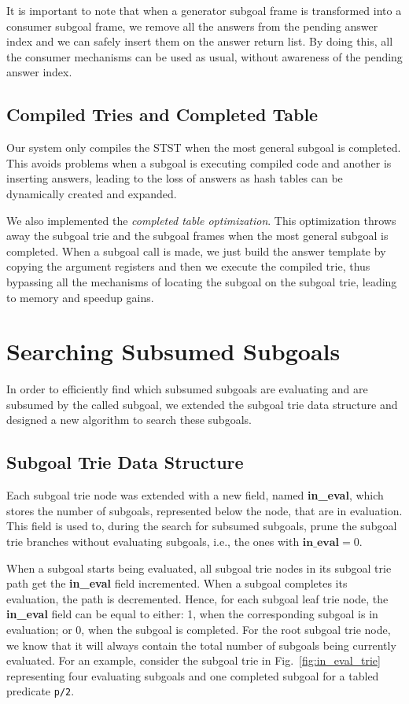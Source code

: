 It is important to note that when a generator subgoal frame is transformed into a
consumer subgoal frame, we remove all the answers from the pending answer index
and we can safely insert them on the answer return list. By doing this, all the consumer mechanisms
can be used as usual, without awareness of the pending answer index.

\subsection{Compiled Tries and Completed Table}

Our system only compiles the STST when the most general subgoal is completed.
This avoids problems when a subgoal is executing compiled code and another
is inserting answers, leading to the loss of answers as hash tables can be
dynamically created and expanded.

We also implemented the \textit{completed table optimization}. This optimization throws
away the subgoal trie and the subgoal frames when the most general subgoal is completed.
When a subgoal call is made, we just build the answer template by copying the argument
registers and then we execute the compiled trie, thus bypassing all the mechanisms of
locating the subgoal on the subgoal trie, leading to memory and speedup gains. 

\section{Searching Subsumed Subgoals}\label{sec:searching_subsumed}

In order to efficiently find which subsumed subgoals are evaluating and are subsumed
by the called subgoal, we extended the subgoal trie data structure and designed a new
algorithm to search these subgoals.

\subsection{Subgoal Trie Data Structure}

Each subgoal trie node was extended with a new field, named
\textbf{in\_eval}, which stores the number of subgoals, represented below the
node, that are in evaluation. This field is used to, during the search
for subsumed subgoals, prune the subgoal trie branches without
evaluating subgoals, i.e., the ones with $\textbf{in\_eval} = 0$.

When a subgoal starts being evaluated, all subgoal trie nodes in its
subgoal trie path get the \textbf{in\_eval} field incremented. When a subgoal
completes its evaluation, the path is decremented. Hence, for each
subgoal leaf trie node, the \textbf{in\_eval} field can be equal to either:
1, when the corresponding subgoal is in evaluation; or 0, when the
subgoal is completed. For the root subgoal trie node, we know that it
will always contain the total number of subgoals being currently
evaluated. For an example, consider the subgoal trie in
Fig.~\ref{fig:in_eval_trie} representing four evaluating subgoals and
one completed subgoal for a tabled predicate \texttt{p/2}.

